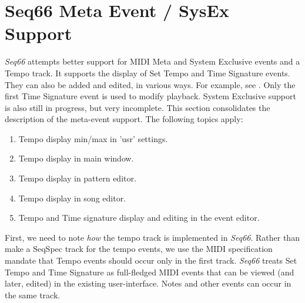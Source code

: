 %
%
%

\section{Seq66 Meta Event / SysEx Support}
\label{sec:meta_events}

   \textsl{Seq66} attempts better support
   for MIDI Meta and System Exclusive events and a Tempo track.
   It supports the display of Set Tempo and Time Signature events.
   They can also be added and edited, in
   various ways.  For example, see .
   Only the first Time Signature event is used to modify playback.
   System Exclusive support is also still in progress, but very incomplete.
   This section consolidates the description of the meta-event support.
   The following topics apply:

   \begin{enumerate}
      \item Tempo display min/max in 'usr' settings.
      \item Tempo display in main window.
      \item Tempo display in pattern editor.
      \item Tempo display in song editor.
      \item Tempo and Time signature display and editing in the event editor.
   \end{enumerate}

   First, we need to note \textsl{how} the tempo track is
   implemented in \textsl{Seq66}.  Rather than make a SeqSpec track for
   the tempo events, we use the MIDI specification mandate that
   Tempo events should occur only in the first track.
   \textsl{Seq66} treats Set Tempo and Time Signature as full-fledged
   MIDI events that can be viewed (and later, edited) in the existing
   user-interface.  Notes and other events can occur in the same
   track.

